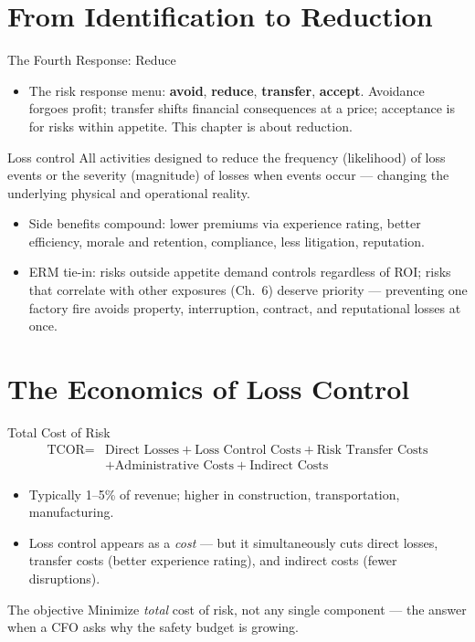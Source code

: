 \documentclass[11pt, aspectratio=169]{beamer}
\begin{document}
\section{From Identification to Reduction}

\begin{frame}{The Fourth Response: Reduce}
\begin{itemize}
  \item The risk response menu: \textbf{avoid}, \textbf{reduce}, \textbf{transfer}, \textbf{accept}. Avoidance forgoes profit; transfer shifts financial consequences at a price; acceptance is for risks within appetite. This chapter is about \alert{reduction}.
\end{itemize}
\medskip
\begin{block}{Loss control}
All activities designed to reduce the \alert{frequency} (likelihood) of loss events or the \alert{severity} (magnitude) of losses when events occur --- changing the underlying physical and operational reality.
\end{block}
\medskip
\begin{itemize}
  \item Side benefits compound: lower premiums via experience rating, better efficiency, morale and retention, compliance, less litigation, reputation.
  \item ERM tie-in: risks outside appetite demand controls regardless of ROI; risks that correlate with other exposures (Ch.~6) deserve priority --- preventing one factory fire avoids property, interruption, contract, and reputational losses at once.
\end{itemize}
\end{frame}

\section{The Economics of Loss Control}

\begin{frame}{Total Cost of Risk}
\[
\begin{aligned}
\text{TCOR} ={}& \text{Direct Losses} + \text{Loss Control Costs} + \text{Risk Transfer Costs} \\
&+ \text{Administrative Costs} + \text{Indirect Costs}
\end{aligned}
\]
\begin{itemize}
  \item Typically 1--5\% of revenue; higher in construction, transportation, manufacturing.
  \item Loss control appears as a \emph{cost} --- but it simultaneously cuts direct losses, transfer costs (better experience rating), and indirect costs (fewer disruptions).
\end{itemize}
\medskip
\begin{block}{The objective}
Minimize \emph{total} cost of risk, not any single component --- the answer when a CFO asks why the safety budget is growing.
\end{block}
\end{frame}
\end{document}
